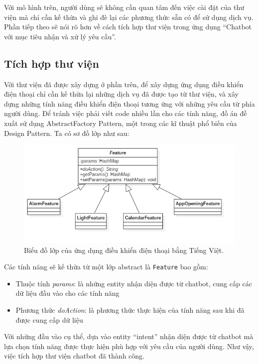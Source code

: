 \documentclass[12pt]{report}
\begin{document}
Với mô hình trên, người dùng sẽ không cần quan tâm đến việc cài đặt của thư viện mà chỉ cần kế thừa và ghi đè lại các phương thức sẵn có để sử dụng dịch vụ. Phần tiếp theo sẽ nói rõ hơn về cách tích hợp thư viện trong ứng dụng ``Chatbot với mục tiêu nhận và xử lý yêu cầu''.

\subsection{Tích hợp thư viện}

Với thư viện đã được xây dựng ở phần trên, để xây dựng ứng dụng điều khiển điện thoại chỉ cần kế thừa lại những dịch vụ đã được tạo từ thư viện, và xây dựng những tính năng điều khiển điện thoại tương ứng với những yêu cầu từ phía người dùng. Để tránh việc phải viết code nhiều lần cho các tính năng, đồ án đề xuất sử dụng AbstractFactory Pattern, một trong các kĩ thuật phổ biến của Design Pattern. Ta có sơ đồ lớp như sau:

\begin{figure}[H]
	\centering
	\includegraphics[width=15cm]{Pics/Chap6/app-model.png}
	\caption{Biểu đồ lớp của ứng dụng điều khiển điện thoại bằng Tiếng Việt.}
	\label{fig:app-model}
\end{figure}

Các tính năng sẽ kế thừa từ một lớp abstract là \texttt{Feature} bao gồm:
\begin{itemize}
	\item Thuộc tính \textit{params}: là những entity nhận diện được từ chatbot, cung cấp các dữ liệu đầu vào cho các tính năng
	\item Phương thức \textit{doAction}: là phương thức thực hiện của tính năng sau khi đã được cung cấp dữ liệu
\end{itemize}

Với những đầu vào cụ thể, dựa vào entity ``intent'' nhận diện được từ chatbot mà lựa chọn tính năng được thực hiện phù hợp với yêu cầu của người dùng. Như vậy, việc tích hợp thư viện chatbot đã thành công.
\end{document}

